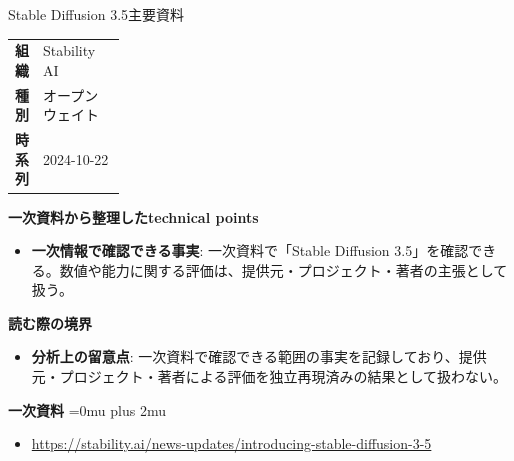 \begin{technicalnote}{Stable Diffusion 3.5}{主要資料}
\begingroup
\begin{tabularx}{\linewidth}{@{}>{\bfseries}p{0.22\linewidth}X@{}}
組織 & Stability AI \\
種別 & オープンウェイト \\
時系列 & 2024-10-22 \\
\end{tabularx}
\smallskip
{\bfseries 一次資料から整理したtechnical points}
\begin{itemize}[leftmargin=1.5em,itemsep=0.35em]
\item \textbf{一次情報で確認できる事実}: 一次資料で「Stable Diffusion 3.5」を確認できる。数値や能力に関する評価は、提供元・プロジェクト・著者の主張として扱う。
\end{itemize}
\begin{minipage}{\linewidth}
{\bfseries 読む際の境界}
\begin{itemize}[leftmargin=1.5em,itemsep=0.35em]
\item \textbf{分析上の留意点}: 一次資料で確認できる範囲の事実を記録しており、提供元・プロジェクト・著者による評価を独立再現済みの結果として扱わない。
\end{itemize}
\begin{samepage}
{\bfseries 一次資料}
\begingroup\sloppy
\Urlmuskip=0mu plus 2mu\relax
\begin{itemize}[leftmargin=1.5em,itemsep=0.25em]
\item {\scriptsize\url{https://stability.ai/news-updates/introducing-stable-diffusion-3-5}}
\end{itemize}
\endgroup
\end{samepage}
\end{minipage}
\endgroup
\end{technicalnote}
\medskip

